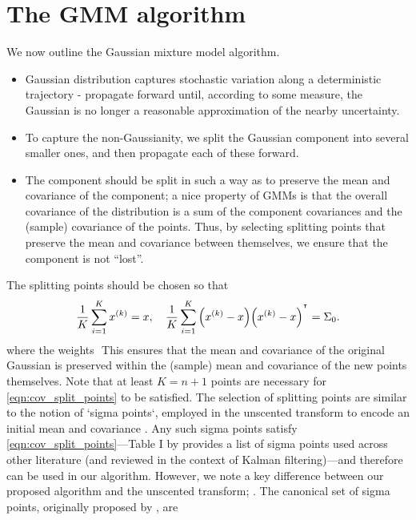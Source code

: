 




\section{The GMM algorithm}\label{sec:gmm_alg}
We now outline the Gaussian mixture model algorithm.


\begin{itemize}
	\item Gaussian distribution captures stochastic variation along a deterministic trajectory - propagate forward until, according to some measure, the Gaussian is no longer a reasonable approximation of the nearby uncertainty.
	\item To capture the non-Gaussianity, we split the Gaussian component into several smaller ones, and then propagate each of these forward.
	\item The component should be split in such a way as to preserve the mean and covariance of the component; a nice property of GMMs is that the overall covariance of the distribution is a sum of the component covariances and the (sample) covariance of the points. Thus, by selecting splitting points that preserve the mean and covariance between themselves, we ensure that the component is not ``lost''.
\end{itemize}


The splitting points should be chosen so that
\begin{equation}
	\frac{1}{K}\sum_{i=1}^K{x^{(k)}} = x, \quad \frac{1}{K}\sum_{i=1}^{K}{\left(x^{(k)} - x\right)\!\left(x^{(k)} - x\right)^{^{\intercal}}} = \Sigma_0.
	\label{eqn:cov_split_points}
\end{equation}
where the weights \(\)
This ensures that the mean and covariance of the original Gaussian is preserved within the (sample) mean and covariance of the new points themselves.
Note that at least \(K = n + 1\) points are necessary for \cref{eqn:cov_split_points} to be satisfied.
The selection of splitting points are similar to the notion of `sigma points`, employed in the unscented transform to encode an initial mean and covariance \citep{Uhlmann_1995_DynamicMapBuilding,JulierEtAl_2000_NewMethodNonlinear}.
Any such sigma points satisfy \cref{eqn:cov_split_points}---Table I by \citet{MenegazEtAl_2015_SystematizationUnscentedKalman} provides a list of sigma points used across other literature (and reviewed in the context of Kalman filtering)---and therefore can be used in our algorithm.
However, we note a key difference between our proposed algorithm and the unscented transform; .
The canonical set of sigma points, originally proposed by \citet{Uhlmann_1995_DynamicMapBuilding}, are

